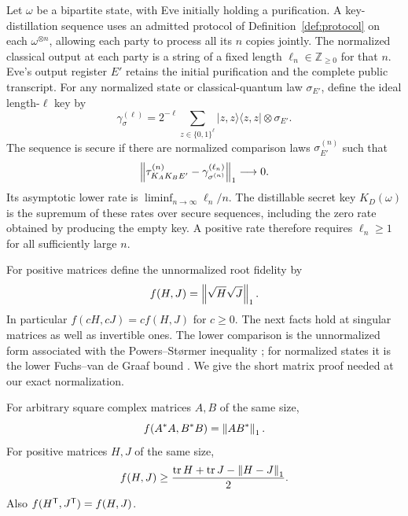 \begin{definition}\label{def:distillable-key}
Let $\omega$ be a bipartite state, with Eve initially holding a
purification.  A key-distillation sequence uses an admitted protocol
of Definition~\ref{def:protocol} on each $\omega^{\otimes n}$, allowing
each party to process all its $n$ copies jointly.  The normalized
classical output at each party is a string of a fixed length
$\ell_n\in\mathbb Z_{\ge0}$ for that $n$.  Eve's output register $E'$
retains the initial purification and the complete public transcript.
For any normalized state or classical-quantum law $\sigma_{E'}$, define
the ideal length-$\ell$ key by
\[
 \gamma^{(\ell)}_\sigma
 =2^{-\ell}\sum_{z\in\{0,1\}^{\ell}}
     |z,z\rangle\langle z,z|\otimes\sigma_{E'}.
\]
The sequence is secure if there are normalized comparison laws
$\sigma_{E'}^{(n)}$ such that
\begin{equation}\label{eq:key-definition}
 \left\lVert\tau^{(n)}_{K_AK_BE'}-
        \gamma^{(\ell_n)}_{\sigma^{(n)}}\right\rVert_1\longrightarrow0.
\end{equation}
Its asymptotic lower rate is $\liminf_{n\to\infty}\ell_n/n$.
The distillable secret key $K_D(\omega)$ is the supremum of these
rates over secure sequences, including the zero rate obtained by
producing the empty key.  A positive rate therefore requires
$\ell_n\ge1$ for all sufficiently large $n$.
\end{definition}

For positive matrices define the unnormalized root fidelity by
\[
 f(H,J)=\left\lVert\sqrt H\sqrt J\right\rVert_1.
\]
In particular $f(cH,cJ)=c f(H,J)$ for $c\ge0$.  The next facts hold
at singular matrices as well as invertible ones.  The lower comparison
is the unnormalized form associated with the Powers--St\o rmer
inequality \cite[Lemma~4.1]{PowersStormer1970}; for normalized states
it is the lower Fuchs--van de Graaf bound
\cite[Theorem~1]{FuchsVdG1999}.  We give the short matrix proof needed
at our exact normalization.

\begin{lemma}\label{lem:fidelity}
For arbitrary square complex matrices $A,B$ of the same size,
\begin{equation}\label{eq:polar-fidelity}
 f(A^*A,B^*B)=\left\lVert AB^*\right\rVert_1.
\end{equation}
For positive matrices $H,J$ of the same size,
\begin{equation}\label{eq:fidelity-lower}
 f(H,J)\ge
 \frac{\operatorname{tr} H+\operatorname{tr} J-\left\lVert H-J\right\rVert_1}{2}.
\end{equation}
Also $f(H^\mathsf T,J^\mathsf T)=f(H,J)$.
\end{lemma}

